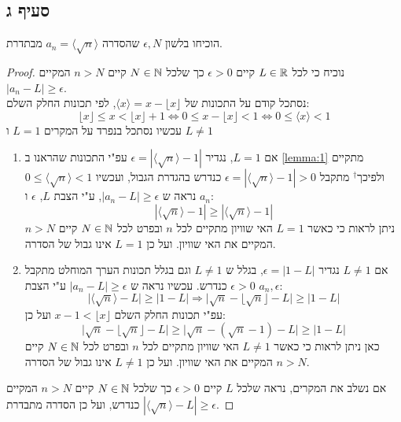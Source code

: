 \documentclass{article}
\begin{document}
	\subsection*{סעיף ג}
	הוכיחו בלשון $\epsilon, N$ שהסדרה $a_n = \langle \sqrt{n} \rangle$ מבתדרת.
	\begin{proof}
		נוכיח כי
		לכל $L \in \mathbb{R}$ 	קיים $\epsilon > 0$ כך שלכל $N \in \mathbb{N}$ קיים $n > N$ המקיים $|a_n-L| \geq \epsilon$. \\
		נסתכל קודם על התכונות של $\langle x \rangle = x - \lfloor x \rfloor$, לפי תכונות החלק השלם:
		\begin{equation} \label{lemma:1}
			\lfloor x \rfloor \leq x < \lfloor x \rfloor + 1 \iff
			0 \leq x - \lfloor x \rfloor < 1 \iff
			0 \leq \langle x \rangle < 1
		\end{equation}
		עכשיו נסתכל בנפרד על המקרים $L = 1$ ו $L \neq 1$
		\begin{enumerate}
			\item אם $L = 1$, נגדיר $\epsilon = |\langle\sqrt{n}\rangle - 1|$
			עפ"י התכונות שהראנו ב \ref{lemma:1} מתקיים \\
			 $0 \leq \langle \sqrt{n} \rangle < 1$ ולפיכך$^\dag$
			  מתקבל $\epsilon = |\langle \sqrt{n} \rangle - 1| > 0$
			כנדרש בהגדרת הגבול, ועכשיו נראה ש $|a_n - L| \geq \epsilon$, ע"י הצבת $L$, $\epsilon$ ו $a_n$:
			\[
				|\langle\sqrt{n}\rangle - 1| \geq |\langle\sqrt{n}\rangle - 1|
			\]
			ניתן לראות כי כאשר $L=1$ האי שוויון מתקיים לכל $n$ ובפרט לכל $N \in \mathbb{N}$ קיים $n > N$ המקיים את האי שוויון.
			ועל כן $L = 1$ אינו גבול של הסדרה.

			\item אם $L \neq 1$ נגדיר $\epsilon = |1 - L|$, בגלל ש $L \neq 1$ וגם בגלל תכונות הערך המוחלט מתקבל $\epsilon > 0$ כנדרש.
			עכשיו נראה ש $|a_n - L| \geq \epsilon$ ע"י הצבת $a_n, \epsilon$:
			\[
				\big| \langle \sqrt{n} \rangle - L\big| \geq \big|1 - L\big| \Rightarrow
				\big| \sqrt{n} - \lfloor \sqrt{n} \rfloor -L \big| \geq \big| 1 - L \big|
			\]
			עפ"י תכונות החלק השלם $x - 1 <\lfloor x \rfloor$ ועל כן:
			\[
				\big| \sqrt{n} - \lfloor \sqrt{n} \rfloor -L \big| \geq
				\big| \sqrt{n} - (\sqrt{n} - 1) -L \big| \geq |1 - L|
			\]
כאן ניתן לראות כי כאשר $L \neq 1$ האי שוויון מתקיים לכל $n$ ובפרט לכל $N \in \mathbb{N}$ קיים $n > N$ המקיים את האי שוויון.
ועל כן $L \neq 1$ אינו גבול של הסדרה.
		\end{enumerate}
אם נשלב את המקרים, נראה שלכל $L$ קיים $\epsilon > 0$ כך שלכל $N \in \mathbb{N}$ קיים $n > N$ המקיים $|\langle \sqrt{n} \rangle - L| \geq \epsilon$ כנדרש, ועל כן הסדרה מתבדרת.
	\end{proof}
\end{document}
